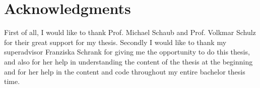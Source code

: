 \chapter*{Acknowledgments}
First of all, I would like to thank Prof. Michael Schaub and Prof. Volkmar Schulz for their great support for my thesis. 
Secondly I would like to thank my superadvisor Franziska Schrank for giving me the opportunity to do this thesis, 
and also for her help in understanding the content of the thesis at the beginning and for her help in the content and code throughout my entire bachelor thesis time.
